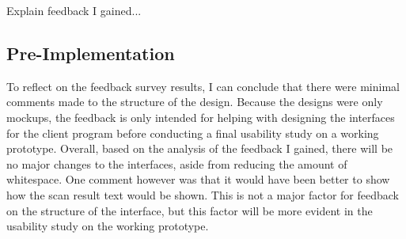 Explain feedback I gained...

\subsection{Pre-Implementation}

To reflect on the feedback survey results, I can conclude that there were minimal comments made to the structure of the design. Because the designs were only mockups, the feedback is only intended for helping with designing the interfaces for the client program before conducting a final usability study on a working prototype. Overall, based on the analysis of the feedback I gained, there will be no major changes to the interfaces, aside from reducing the amount of whitespace. One comment however was that it would have been better to show how the scan result text would be shown. This is not a major factor for feedback on the structure of the interface, but this factor will be more evident in the usability study on the working prototype.
